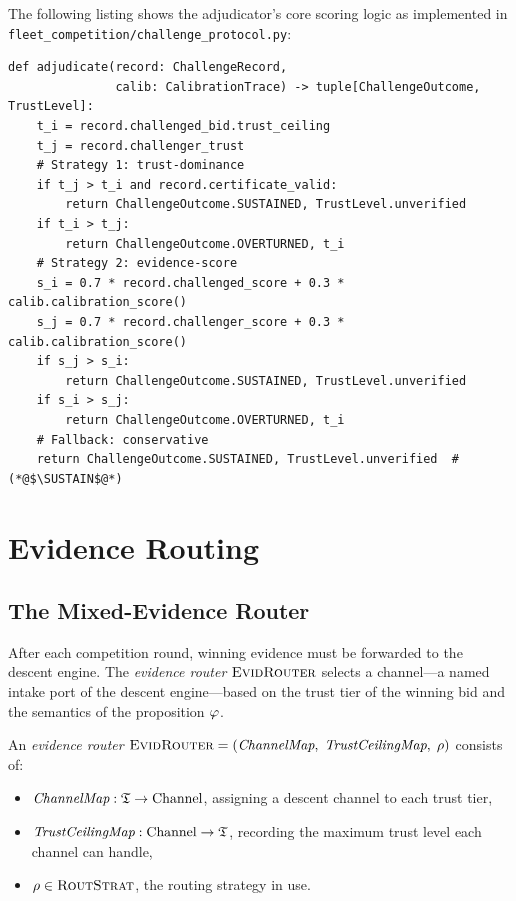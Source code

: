 \documentclass[11pt]{article}
\providecommand{\EvidRouter}{\textsc{EvidRouter}} %
\providecommand{\RoutStrat}{\textsc{RoutStrat}}   %
\providecommand{\SUSTAIN}{\textsc{Sustain}}
\begin{document}
The following listing shows the adjudicator's core scoring logic as implemented
in \texttt{fleet\_competition/challenge\_protocol.py}:

\begin{lstlisting}[style=jugeo-python, caption={Adjudicator: trust-dominance
  and evidence-score resolution
  (\texttt{fleet\_competition/challenge\_protocol.py})},
  label={lst:adj}]
def adjudicate(record: ChallengeRecord,
               calib: CalibrationTrace) -> tuple[ChallengeOutcome, TrustLevel]:
    t_i = record.challenged_bid.trust_ceiling
    t_j = record.challenger_trust
    # Strategy 1: trust-dominance
    if t_j > t_i and record.certificate_valid:
        return ChallengeOutcome.SUSTAINED, TrustLevel.unverified
    if t_i > t_j:
        return ChallengeOutcome.OVERTURNED, t_i
    # Strategy 2: evidence-score
    s_i = 0.7 * record.challenged_score + 0.3 * calib.calibration_score()
    s_j = 0.7 * record.challenger_score + 0.3 * calib.calibration_score()
    if s_j > s_i:
        return ChallengeOutcome.SUSTAINED, TrustLevel.unverified
    if s_i > s_j:
        return ChallengeOutcome.OVERTURNED, t_i
    # Fallback: conservative
    return ChallengeOutcome.SUSTAINED, TrustLevel.unverified  # (*@$\SUSTAIN$@*)
\end{lstlisting}

\section{Evidence Routing}\label{sec:routing}

\subsection{The Mixed-Evidence Router}

After each competition round, winning evidence must be forwarded to the descent
engine.  The \emph{evidence router} $\EvidRouter$ selects a channel---a named
intake port of the descent engine---based on the trust tier of the winning bid
and the semantics of the proposition $\varphi$.

\begin{definition}[\EvidRouter{}]\label{def:evidrouter}
An \emph{evidence router} $\EvidRouter = (\textit{ChannelMap},\;
\textit{TrustCeilingMap},\; \rho)$ consists of:
\begin{itemize}
  \item $\textit{ChannelMap} : \mathfrak{T} \to \mathrm{Channel}$, assigning a
    descent channel to each trust tier,
  \item $\textit{TrustCeilingMap} : \mathrm{Channel} \to \mathfrak{T}$, recording the
    maximum trust level each channel can handle,
  \item $\rho \in \RoutStrat$, the routing strategy in use.
\end{itemize}
\end{definition}
\end{document}
